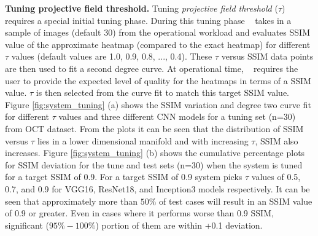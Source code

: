\vspace{2mm}
\noindent \textbf{Tuning projective field threshold.}
Tuning \textit{projective field threshold} ($\tau$) requires a special initial tuning phase.
During this tuning phase \system~ takes in a sample of images (default 30) from the operational workload and evaluates SSIM value of the approximate heatmap (compared to the exact heatmap) for different $\tau$ values (default values are 1.0, 0.9, 0.8, ..., 0.4).
These $\tau$ versus SSIM data points are then used to fit a second degree curve.
At operational time, \system~ requires the user to provide the expected level of quality for the heatmaps in terms of a SSIM value. $\tau$ is then selected from the curve fit to match this target SSIM value.
Figure \ref{fig:system_tuning} (a) shows the SSIM variation and degree two curve fit for different $\tau$ values and three different CNN models for a tuning set (n=30) from OCT dataset.
From the plots it can be seen that the distribution of SSIM versus $\tau$ lies in a lower dimensional manifold and with increasing $\tau$, SSIM also increases.
Figure \ref{fig:system_tuning} (b) shows the cumulative percentage plots for SSIM deviation for the tune and test sets (n=30) when the system is tuned for a target SSIM of 0.9.
For a target SSIM of 0.9 system picks $\tau$ values of 0.5, 0.7, and 0.9 for VGG16, ResNet18, and Inception3 models respectively.
It can be seen that approximately more than $50\%$ of test cases will result in an SSIM value of 0.9 or greater.
Even in cases where it performs worse than 0.9 SSIM, significant ($95\%-100\%$) portion of them are within +0.1 deviation.

